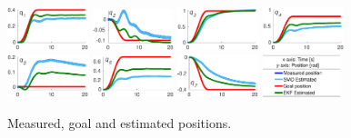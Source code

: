 \documentclass[conference,letterpaper]{ieeeconf}
\begin{document}
\begin{figure}
  \centering
  \includegraphics[width=0.21\textwidth]{Figures/result_q1.eps}
  \includegraphics[width=0.21\textwidth]{Figures/result_q2.eps}
  \includegraphics[width=0.21\textwidth]{Figures/result_q3.eps}
  \includegraphics[width=0.21\textwidth]{Figures/result_q4.eps}
  \includegraphics[width=0.21\textwidth]{Figures/result_q5.eps}
  \includegraphics[width=0.21\textwidth]{Figures/result_q6.eps}
  \includegraphics[width=0.21\textwidth]{Figures/result_q7.eps}
  \includegraphics[width=0.2\textwidth]{Figures/result_q_legend.eps}
  \caption{Measured, goal and estimated positions.}
  \label{fig:result_q}
\end{figure}
\end{document}
